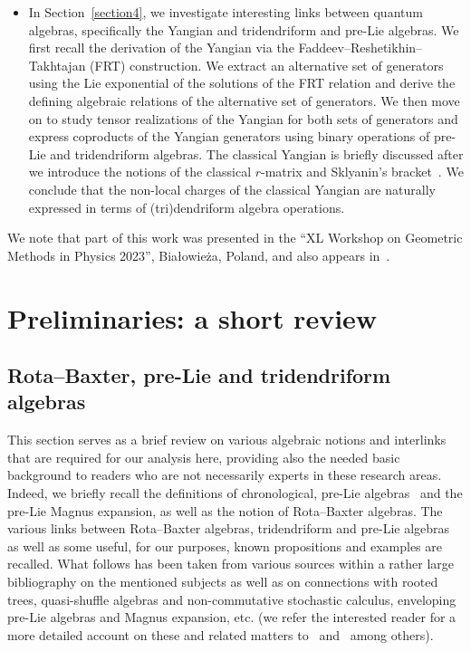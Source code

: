 \documentclass[pdftex]{sigma}
\numberwithin{equation}{section}
\theoremstyle{definition}
\begin{document}
\begin{itemize}
\item In Section~\ref{section4}, we investigate {interesting links} between quantum algebras, specifically the Yangian and tridendriform and pre-Lie algebras. We first recall the derivation of the Yangian via the Faddeev--Reshetikhin--Takhtajan (FRT) construction. We extract an alternative set of generators using the Lie exponential of the solutions of the FRT relation and derive the defining algebraic relations of the alternative set of generators. We then move on to study tensor realizations of the Yangian for both sets of generators and express coproducts of the Yangian generators using binary operations of pre-Lie and tridendriform algebras. The classical Yangian is briefly discussed after we introduce the notions of the classical $r$-matrix and Sklyanin's bracket~\cite{FT}. We conclude that the non-local charges of the classical Yangian are naturally expressed in terms of (tri)dendriform algebra operations.
\end{itemize}

We note that part of this work was presented in the ``XL Workshop on Geometric Methods in Physics 2023'', Bia{\l}owie\.{z}a, Poland, and also appears in~\cite{DoikouBal}.

\section{Preliminaries: a short review}
\subsection{Rota--Baxter, pre-Lie and tridendriform algebras}\label{section2.1}

 This section serves as a brief review on various algebraic notions and interlinks that are required for our analysis here, providing also the needed basic background to readers who are not necessarily experts in these research areas. Indeed, we briefly recall the definitions of chronological, pre-Lie algebras~\cite{Chrono, PreLie} and the pre-Lie Magnus expansion, as well as the notion of Rota--Baxter algebras.
The various links between Rota--Baxter algebras, tridendriform and pre-Lie algebras as well as some useful, for our purposes, known propositions and examples are recalled. What follows has been taken from various sources within a rather large bibliography on the mentioned subjects as well as on connections with rooted trees, quasi-shuffle algebras and non-commutative stochastic calculus, enveloping pre-Lie algebras and Magnus expansion, etc. (we refer the interested reader for a more detailed account on these and related matters to~\cite{Bai, Ebra2, new5,Fer, EbraMan,new3, new4, Manchon} and~\cite{tree1, tree2} among others).
\end{document}
